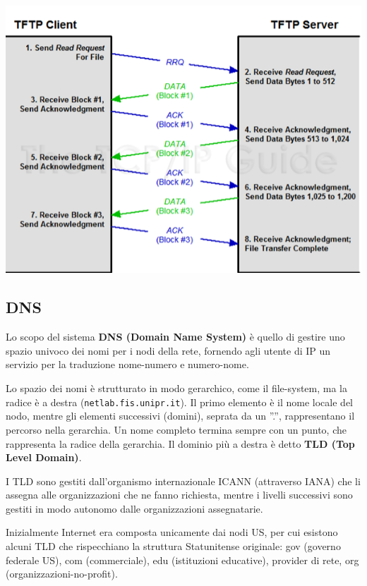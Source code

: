             \begin{center}
                \includegraphics[scale=0.]{chapters/6/assets/schema_b.png}
            \end{center}

    \subsection{DNS}
        Lo scopo del sistema \textbf{DNS (Domain Name System)} è quello di gestire uno spazio univoco dei nomi per i nodi della rete, fornendo agli utente di IP un servizio per la traduzione nome-numero e numero-nome.
    
        Lo spazio dei nomi è strutturato in modo gerarchico, come il file-system, ma la radice è a destra (\verb:netlab.fis.unipr.it:). Il primo elemento è il nome locale del nodo, mentre gli elementi successivi (domini), seprata da un ”.”, rappresentano il percorso nella gerarchia. Un nome completo termina sempre con un punto, che rappresenta la radice della gerarchia.
        Il dominio più a destra è detto \textbf{TLD (Top Level Domain)}.
    
        I TLD sono gestiti dall'organismo internazionale ICANN (attraverso IANA) che li assegna alle organizzazioni che ne fanno richiesta, mentre i livelli successivi sono gestiti in modo autonomo dalle organizzazioni assegnatarie.
    
        Inizialmente Internet era composta unicamente dai nodi US, per cui esistono alcuni TLD che rispecchiano la struttura Statunitense originale: gov (governo federale US), com (commerciale), edu (istituzioni educative), provider di rete, org (organizzazioni-no-profit).
    
